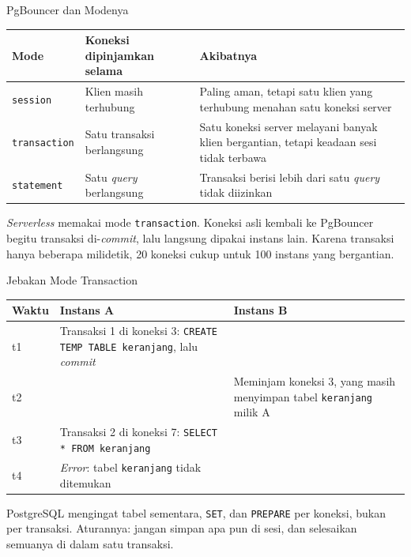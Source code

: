\documentclass[aspectratio=169, table, 12pt]{beamer}
\begin{document}
\begin{frame}{{\Large PgBouncer dan Modenya}}
  \vspace{5pt}
  {\centering
  {\small
  \begin{tabularx}{\textwidth}{lYY}
    \hline
    \textbf{Mode} & \textbf{Koneksi dipinjamkan selama} & \textbf{Akibatnya} \\
    \hline
    \texttt{session} & Klien masih terhubung & Paling aman, tetapi satu klien yang terhubung menahan satu koneksi server \\
    \hline
    \texttt{transaction} & Satu transaksi berlangsung & Satu koneksi server melayani banyak klien bergantian, tetapi keadaan sesi tidak terbawa \\
    \hline
    \texttt{statement} & Satu \textit{query} berlangsung & Transaksi berisi lebih dari satu \textit{query} tidak diizinkan \\
    \hline
  \end{tabularx}}\par}

  \vspace{8pt}
  {\footnotesize \textit{Serverless} memakai mode \texttt{transaction}.
  Koneksi asli kembali ke PgBouncer begitu transaksi di-\textit{commit}, lalu
  langsung dipakai instans lain. Karena transaksi hanya beberapa milidetik,
  20 koneksi cukup untuk 100 instans yang bergantian.}
\end{frame}

\begin{frame}{{\Large Jebakan Mode Transaction}}
  \vspace{5pt}
  {\centering
  {\footnotesize
  \begin{tabularx}{\textwidth}{lYY}
    \hline
    \textbf{Waktu} & \textbf{Instans A} & \textbf{Instans B} \\
    \hline
    t1 & Transaksi 1 di koneksi 3: \texttt{CREATE TEMP TABLE keranjang}, lalu \textit{commit} & \\
    \hline
    t2 & & Meminjam koneksi 3, yang masih menyimpan tabel \texttt{keranjang} milik A \\
    \hline
    t3 & Transaksi 2 di koneksi 7: \texttt{SELECT * FROM keranjang} & \\
    \hline
    t4 & \textit{Error}: tabel \texttt{keranjang} tidak ditemukan & \\
    \hline
  \end{tabularx}}\par}

  \vspace{8pt}
  {\footnotesize PostgreSQL mengingat tabel sementara, \texttt{SET}, dan
  \texttt{PREPARE} per koneksi, bukan per transaksi. Aturannya: jangan simpan
  apa pun di sesi, dan selesaikan semuanya di dalam satu transaksi.}
\end{frame}
\end{document}
